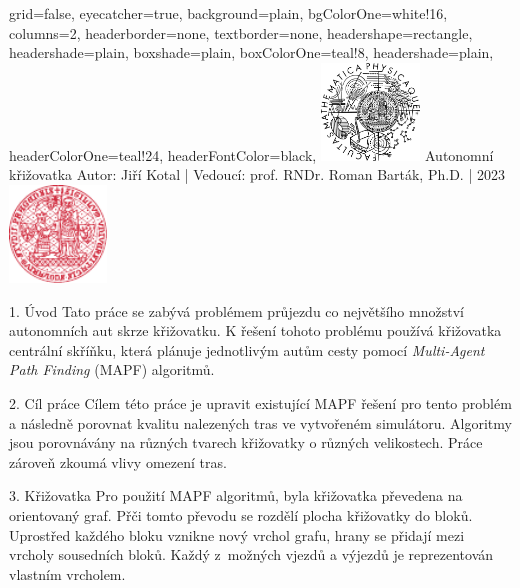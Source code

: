 \documentclass[portrait,fontscale=0.26,paperwidth=842mm,paperheight=1185mm]{baposter}
\begin{document}
	\color{black!80} %
	\begin{poster}{grid=false,
		eyecatcher=true,
		background=plain,
		bgColorOne=white!16, %
		columns=2,
		headerborder=none,
		textborder=none,
		headershape=rectangle,
		headershade=plain,
		boxshade=plain,
		boxColorOne=teal!8,
		headershade=plain,
		headerColorOne=teal!24, %
		headerFontColor=black,
	}%
	{\includegraphics[height=7em]{logos/mff-black}}
	{Autonomní křižovatka}
	{\vspace{1ex} Autor: Jiří Kotal | Vedoucí: prof. RNDr. Roman Barták, Ph.D. | 2023}
	{\includegraphics[height=7em]{logos/uk-red}}


%
%

		\begin{posterbox}[column=0,name=uvod]{1. Úvod}
			Tato práce se zabývá problémem průjezdu co největšího množství autonomních aut skrze křižovatku.
			K řešení tohoto problému používá křižovatka centrální skříňku,
			která plánuje jednotlivým autům cesty pomocí \textit{Multi-Agent Path Finding} (MAPF) algoritmů.
		\end{posterbox}

		\begin{posterbox}[column=0, name=cile, below=uvod, headerColorOne=purple!24, boxColorOne=purple!8]{2. Cíl práce}
			Cílem této práce je upravit existující MAPF řešení pro tento problém a
			následně porovnat kvalitu nalezených tras ve vytvořeném simulátoru.
			Algoritmy jsou porovnávány na různých tvarech křižovatky o různých velikostech.
			Práce zároveň zkoumá vlivy omezení tras.
		\end{posterbox}

		\begin{posterbox}[column=0, name=krizovatka, below=cile]{3. Křižovatka}
			Pro použití MAPF algoritmů, byla křižovatka převedena na orientovaný graf.
			Přči tomto převodu se rozdělí plocha křižovatky do bloků.
			Uprostřed každého bloku vznikne nový vrchol grafu, hrany se přidají mezi vrcholy sousedních bloků.
			Každý z~možných vjezdů a výjezdů je reprezentován vlastním vr\-cho\-lem.


\end{posterbox}
\end{poster}
\end{document}
